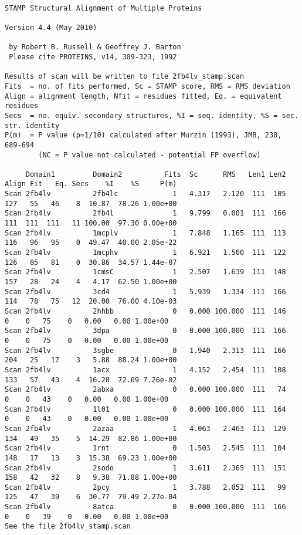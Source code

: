 \begin{scriptsize}\begin{verbatim}

STAMP Structural Alignment of Multiple Proteins

Version 4.4 (May 2010)

 by Robert B. Russell & Geoffrey J. Barton 
 Please cite PROTEINS, v14, 309-323, 1992

Results of scan will be written to file 2fb4lv_stamp.scan
Fits  = no. of fits performed, Sc = STAMP score, RMS = RMS deviation
Align = alignment length, Nfit = residues fitted, Eq. = equivalent residues
Secs  = no. equiv. secondary structures, %I = seq. identity, %S = sec. str. identity
P(m)  = P value (p=1/10) calculated after Murzin (1993), JMB, 230, 689-694
        (NC = P value not calculated - potential FP overflow)

     Domain1         Domain2          Fits  Sc      RMS   Len1 Len2 Align Fit   Eq. Secs    %I    %S     P(m)
Scan 2fb4lv          2fb4lc             1   4.317   2.120  111  105  127   55   46    8  10.87  78.26 1.00e+00
Scan 2fb4lv          2fb4l              1   9.799   0.001  111  166  111  111  111   11 100.00  97.30 0.00e+00
Scan 2fb4lv          1mcplv             1   7.848   1.165  111  113  116   96   95    0  49.47  40.00 2.05e-22
Scan 2fb4lv          1mcphv             1   6.921   1.500  111  122  126   85   81    0  30.86  34.57 1.44e-07
Scan 2fb4lv          1cmsC              1   2.507   1.639  111  148  157   28   24    4   4.17  62.50 1.00e+00
Scan 2fb4lv          3cd4               1   5.939   1.334  111  166  114   78   75   12  20.00  76.00 4.10e-03
Scan 2fb4lv          2hhbb              0   0.000 100.000  111  146    0    0   75    0   0.00   0.00 1.00e+00
Scan 2fb4lv          3dpa               0   0.000 100.000  111  166    0    0   75    0   0.00   0.00 1.00e+00
Scan 2fb4lv          3sgbe              0   1.940   2.313  111  166  204   25   17    3   5.88  88.24 1.00e+00
Scan 2fb4lv          1acx               1   4.152   2.454  111  108  133   57   43    4  16.28  72.09 7.26e-02
Scan 2fb4lv          2abxa              0   0.000 100.000  111   74    0    0   43    0   0.00   0.00 1.00e+00
Scan 2fb4lv          1l01               0   0.000 100.000  111  164    0    0   43    0   0.00   0.00 1.00e+00
Scan 2fb4lv          2azaa              1   4.063   2.463  111  129  134   49   35    5  14.29  82.86 1.00e+00
Scan 2fb4lv          1rnt               0   1.503   2.545  111  104  148   17   13    3  15.38  69.23 1.00e+00
Scan 2fb4lv          2sodo              1   3.611   2.365  111  151  158   42   32    8   9.38  71.88 1.00e+00
Scan 2fb4lv          2pcy               1   3.788   2.052  111   99  125   47   39    6  30.77  79.49 2.27e-04
Scan 2fb4lv          8atca              0   0.000 100.000  111  166    0    0   39    0   0.00   0.00 1.00e+00
See the file 2fb4lv_stamp.scan

\end{verbatim} \end{scriptsize}

